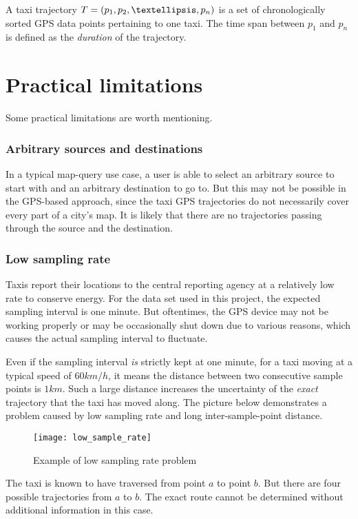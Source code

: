 \begin{defn}\label{Def: trajectory}
A taxi trajectory $T = (p_1,p_2,\textellipsis,p_n)$ is a set of chronologically sorted GPS data points pertaining to one taxi. The time span between $p_1$ and $p_n$ is defined as the \emph{duration} of the trajectory. 
\end{defn}

\section{Practical limitations} \label{Sec:limitation}
Some practical limitations are worth mentioning. 
\subsubsection{Arbitrary sources and destinations}
In a typical map-query use case, a user is able to select an arbitrary source to start with and an arbitrary destination to go to. But this may not be possible in the GPS-based approach, since the taxi GPS trajectories do not necessarily cover every part of a city's map. It is likely that there are no trajectories passing through the source and the destination.
\subsubsection{Low sampling rate}
Taxis report their locations to the central reporting agency at a relatively low rate to conserve energy. For the data set used in this project, the expected sampling interval is one minute. But oftentimes, the GPS device may not be working properly or may be occasionally shut down due to various reasons, which causes the actual sampling interval to fluctuate. 

Even if the sampling interval \emph{is} strictly kept at one minute, for a taxi moving at a typical speed of $60km/h$, it means the distance between two consecutive sample points is $1km$. Such a large distance increases the uncertainty of the \emph{exact} trajectory that the taxi has moved along. The picture\cite{TDR10} below demonstrates a problem caused by low sampling rate and long inter-sample-point distance.
\begin{figure}[h]
\texttt{[image: low\_sample\_rate]}
\centering
\caption{Example of low sampling rate problem}
\end{figure}

The taxi is known to have traversed from point $a$ to point $b$. But there are four possible trajectories from $a$ to $b$. The exact route cannot be determined without additional information in this case.
